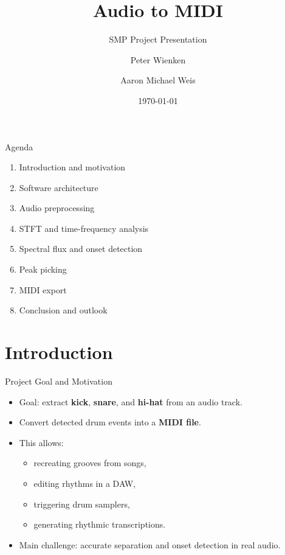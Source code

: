 \documentclass[aspectratio=169]{beamer}
\title{Audio to MIDI}
\subtitle{SMP Project Presentation}
\author{Peter Wienken \and Aaron Michael Weis}
\date{\today}
\begin{document}
\begin{frame}
    \titlepage
\end{frame}

\begin{frame}{Agenda}
    \begin{enumerate}
        \item Introduction and motivation
        \item Software architecture
        \item Audio preprocessing
        \item STFT and time-frequency analysis
        \item Spectral flux and onset detection
        \item Peak picking
        \item MIDI export
        \item Conclusion and outlook
    \end{enumerate}
\end{frame}

\section{Introduction}

\begin{frame}{Project Goal and Motivation}
    \begin{itemize}
        \item Goal: extract \textbf{kick}, \textbf{snare}, and \textbf{hi-hat} from an audio track.
        \item Convert detected drum events into a \textbf{MIDI file}.
        \item This allows:
        \begin{itemize}
            \item recreating grooves from songs,
            \item editing rhythms in a DAW,
            \item triggering drum samplers,
            \item generating rhythmic transcriptions.
        \end{itemize}
        \item Main challenge: accurate separation and onset detection in real audio.
    \end{itemize}
\end{frame}
\end{document}

